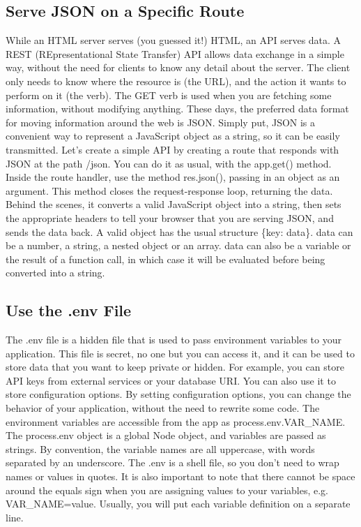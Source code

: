 \documentclass{article}%
\begin{document}
\subsection{Serve JSON on a Specific Route}%
\label{subsec:ServeJSONonaSpecificRoute}%
While an HTML server serves (you guessed it!) HTML, an API serves data. A REST (REpresentational State Transfer) API allows data exchange in a simple way, without the need for clients to know any detail about the server. The client only needs to know where the resource is (the URL), and the action it wants to perform on it (the verb). The GET verb is used when you are fetching some information, without modifying anything. These days, the preferred data format for moving information around the web is JSON. Simply put, JSON is a convenient way to represent a JavaScript object as a string, so it can be easily transmitted.\newline%
Let's create a simple API by creating a route that responds with JSON at the path /json. You can do it as usual, with the app.get() method. Inside the route handler, use the method res.json(), passing in an object as an argument. This method closes the request{-}response loop, returning the data. Behind the scenes, it converts a valid JavaScript object into a string, then sets the appropriate headers to tell your browser that you are serving JSON, and sends the data back. A valid object has the usual structure \{key: data\}. data can be a number, a string, a nested object or an array. data can also be a variable or the result of a function call, in which case it will be evaluated before being converted into a string.\newline%

%
\subsection{Use the .env File}%
\label{subsec:Usethe.envFile}%
The .env file is a hidden file that is used to pass environment variables to your application. This file is secret, no one but you can access it, and it can be used to store data that you want to keep private or hidden. For example, you can store API keys from external services or your database URI. You can also use it to store configuration options. By setting configuration options, you can change the behavior of your application, without the need to rewrite some code.\newline%
The environment variables are accessible from the app as process.env.VAR\_NAME. The process.env object is a global Node object, and variables are passed as strings. By convention, the variable names are all uppercase, with words separated by an underscore. The .env is a shell file, so you don’t need to wrap names or values in quotes. It is also important to note that there cannot be space around the equals sign when you are assigning values to your variables, e.g. VAR\_NAME=value. Usually, you will put each variable definition on a separate line.\newline%
\end{document}
